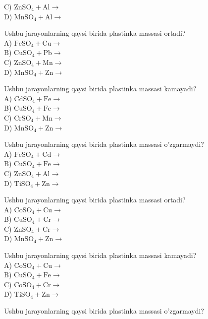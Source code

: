 C) $\mathrm{ZnSO}_{4}+\mathrm{Al} \rightarrow$\\
D) $\mathrm{MnSO}_{4}+\mathrm{Al} \rightarrow$
  \item Ushbu jarayonlarning qaysi birida plastinka massasi ortadi?\\
A) $\mathrm{FeSO}_{4}+\mathrm{Cu} \rightarrow$\\
B) $\mathrm{CuSO}_{4}+\mathrm{Pb} \rightarrow$\\
C) $\mathrm{ZnSO}_{4}+\mathrm{Mn} \rightarrow$\\
D) $\mathrm{MnSO}_{4}+\mathrm{Zn} \rightarrow$
  \item Ushbu jarayonlarning qaysi birida plastinka massasi kamayadi?\\
A) $\mathrm{CdSO}_{4}+\mathrm{Fe} \rightarrow$\\
B) $\mathrm{CuSO}_{4}+\mathrm{Fe} \rightarrow$\\
C) $\mathrm{CrSO}_{4}+\mathrm{Mn} \rightarrow$\\
D) $\mathrm{MnSO}_{4}+\mathrm{Zn} \rightarrow$
  \item Ushbu jarayonlarning qaysi birida plastinka massasi o'zgarmaydi?\\
A) $\mathrm{FeSO}_{4}+\mathrm{Cd} \rightarrow$\\
B) $\mathrm{CuSO}_{4}+\mathrm{Fe} \rightarrow$\\
C) $\mathrm{ZnSO}_{4}+\mathrm{Al} \rightarrow$\\
D) $\mathrm{TiSO}_{4}+\mathrm{Zn} \rightarrow$
  \item Ushbu jarayonlarning qaysi birida plastinka massasi ortadi?\\
A) $\mathrm{CoSO}_{4}+\mathrm{Cu} \rightarrow$\\
B) $\mathrm{CuSO}_{4}+\mathrm{Cr} \rightarrow$\\
C) $\mathrm{ZnSO}_{4}+\mathrm{Cr} \rightarrow$\\
D) $\mathrm{MnSO}_{4}+\mathrm{Zn} \rightarrow$
  \item Ushbu jarayonlarning qaysi birida plastinka massasi kamayadi?\\
A) $\mathrm{CoSO}_{4}+\mathrm{Cu} \rightarrow$\\
B) $\mathrm{CuSO}_{4}+\mathrm{Fe} \rightarrow$\\
C) $\mathrm{CoSO}_{4}+\mathrm{Cr} \rightarrow$\\
D) $\mathrm{TiSO}_{4}+\mathrm{Zn} \rightarrow$
  \item Ushbu jarayonlarning qaysi birida plastinka massasi o'zgarmaydi?\\
